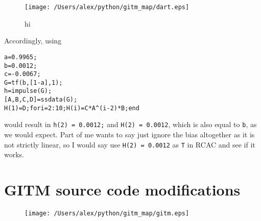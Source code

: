 \documentclass[letterpaper, 11 pt]{article}
\newenvironment{code} %
 {\quote\small\begin{alltt}} 
 {\end{alltt}\endquote}
\begin{document}
\begin{figure}
  \texttt{[image: /Users/alex/python/gitm\_map/dart.eps]}
\caption{hi}
\end{figure}


Accordingly, using 



\begin{code}
a=0.9965;
b=0.0012;
c=-0.0067; 
G=tf(b,[1 -a],1); 
h=impulse(G); %
[A,B,C,D]=ssdata(G);
H(1)=D; for i=2:10; H(i)=C*A^(i-2)*B; end %
\end{code}
would result in \verb|h(2) = 0.0012;| and \verb|H(2) = 0.0012|, which is also equal to \verb|b|, as we would expect. 
Part of me wants to say just ignore the bias altogether as it is not strictly linear, so I would say use \verb|H(2) = 0.0012| as \verb|T| in RCAC and see if it works.

\section{GITM source code modifications}\label{s:gitm}
\begin{figure}
  \texttt{[image: /Users/alex/python/gitm\_map/gitm.eps]}
\end{figure}
\end{document}
